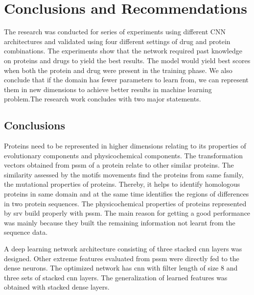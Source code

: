\chapter{Conclusions and Recommendations}

The research was conducted for series of experiments using different CNN architectures and validated using four different settings of drug and protein combinations. The experiments show that the network required past knowledge on proteins and drugs to yield the best results. The model would yield best scores when both the protein and drug were present in the training phase. We also conclude that if the domain has fewer parameters to learn from, we can represent them in new dimensions to achieve better results in machine learning problem.The research work concludes with two major statements.

\section{Conclusions}
    Proteins need to be represented in higher dimensions relating to its properties of evolutionary components and physicochemical components. The transformation vectors obtained from \acrfull{pssm} of a protein relate to other similar proteins. The similarity assessed by the motifs movements find the proteins from same family, the mutational properties of proteins. Thereby, it helps to identify homologous proteins in same domain and at the same time identifies the regions of differences in two protein sequences. The physicochemical properties of proteins represented by \acrfull{srv} build properly with \acrshort{pssm}. The main reason for getting a good performance was mainly because they built the remaining information not learnt from the sequence data.

    A deep learning network architecture consisting of three stacked \acrfull{cnn} layers was designed. Other extreme features evaluated from \acrshort{pssm} were directly fed to the dense neurons. The optimized network has \acrshort{cnn} with filter length of size 8 and three sets of stacked \acrshort{cnn} layers. The generalization of learned features was obtained with stacked dense layers.

